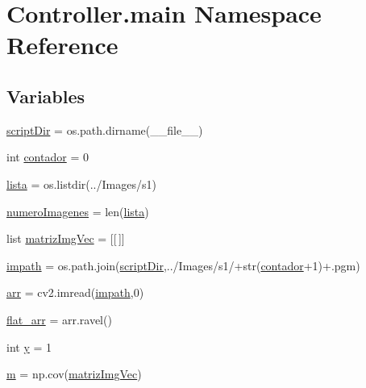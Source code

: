 \hypertarget{namespace_controller_1_1main}{}\section{Controller.\+main Namespace Reference}
\label{namespace_controller_1_1main}
\subsection*{Variables}
\begin{DoxyCompactItemize}
\item 
\hyperlink{namespace_controller_1_1main_afde056e3ffb39cf4210266e4a3c724ec}{script\+Dir} = os.\+path.\+dirname(\+\_\+\+\_\+file\+\_\+\+\_\+)
\item 
int \hyperlink{namespace_controller_1_1main_a551a13a2be12ee8db7e027437ded21e7}{contador} = 0
\item 
\hyperlink{namespace_controller_1_1main_a6808351aab7a7dabdfde550a30c719b1}{lista} = os.\+listdir(\textquotesingle{}../Images/s1\textquotesingle{})
\item 
\hyperlink{namespace_controller_1_1main_ab64b1d5d85baa87feb723b5020958dc9}{numero\+Imagenes} = len(\hyperlink{namespace_controller_1_1main_a6808351aab7a7dabdfde550a30c719b1}{lista})
\item 
list \hyperlink{namespace_controller_1_1main_a4272c41c978f6d49bb441a74e2f83b97}{matriz\+Img\+Vec} = \mbox{[}\mbox{[}$\,$\mbox{]}\mbox{]}
\item 
\hyperlink{namespace_controller_1_1main_ada4e168ced647a0550eb8ae2c15e1037}{impath} = os.\+path.\+join(\hyperlink{namespace_controller_1_1main_afde056e3ffb39cf4210266e4a3c724ec}{script\+Dir},\textquotesingle{}../Images/s1/\textquotesingle{}+str(\hyperlink{namespace_controller_1_1main_a551a13a2be12ee8db7e027437ded21e7}{contador}+1)+\textquotesingle{}.pgm\textquotesingle{})
\item 
\hyperlink{namespace_controller_1_1main_adad82d87439471603c309d29ce1fcd16}{arr} = cv2.\+imread(\hyperlink{namespace_controller_1_1main_ada4e168ced647a0550eb8ae2c15e1037}{impath},0)
\item 
\hyperlink{namespace_controller_1_1main_aedd35c1d9c6106eaec585482a5020709}{flat\+\_\+arr} = arr.\+ravel()
\item 
int \hyperlink{namespace_controller_1_1main_a71a788edfd86f78336518c22203e2bc4}{y} = 1
\item 
\hyperlink{namespace_controller_1_1main_a16245faf87dfaee9eec6634fd40179c0}{m} = np.\+cov(\hyperlink{namespace_controller_1_1main_a4272c41c978f6d49bb441a74e2f83b97}{matriz\+Img\+Vec})
\end{DoxyCompactItemize}


